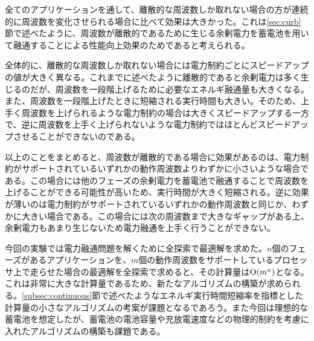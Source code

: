 全てのアプリケーションを通して、離散的な周波数しか取れない場合の方が連続的に周波数を変化させられる場合に比べて効果は大きかった。これは\ref{sec:curb}節で述べたように、周波数が離散的であるために生じる余剰電力を蓄電池を用いて融通することによる性能向上効果のためであると考えられる。

全体的に、離散的な周波数しか取れない場合には電力制約ごとにスピードアップの値が大きく異なる。これまでに述べたように離散的であると余剰電力は多く生じるのだが、周波数を一段階上げるために必要なエネルギ融通量も大きくなる。また、周波数を一段階上げたときに短縮される実行時間も大きい。そのため、上手く周波数を上げられるような電力制約の場合は大きくスピードアップする一方で、逆に周波数を上手く上げられないような電力制約ではほとんどスピードアップさせることができないのである。

以上のことをまとめると、周波数が離散的である場合に効果があるのは、電力制約がサポートされているいずれかの動作周波数よりわずかに小さいような場合である。この場合には他のフェーズの余剰電力を蓄電池で融通することで周波数を上げることができる可能性が高いため、実行時間が大きく短縮される。逆に効果が薄いのは電力制約がサポートされているいずれかの動作周波数と同じか、わずかに大きい場合である。この場合には次の周波数まで大きなギャップがある上、余剰電力もあまり生じないため電力融通を上手く行うことができない。

今回の実験では電力融通問題を解くために全探索で最適解を求めた。$n$個のフェーズがあるアプリケーションを、$m$個の動作周波数をサポートしているプロセッサ上で走らせた場合の最適解を全探索で求めると、その計算量は${\rm O}(m^n)$となる。これは非常に大きな計算量であるため、新たなアルゴリズムの構築が求められる。\ref{subsec:continuous}節で述べたようなエネルギ実行時間短縮率を指標とした計算量の小さなアルゴリズムの考案が課題となるであろう。また今回は理想的な蓄電池を想定したが、蓄電池の電池容量や充放電速度などの物理的制約を考慮に入れたアルゴリズムの構築も課題である。










